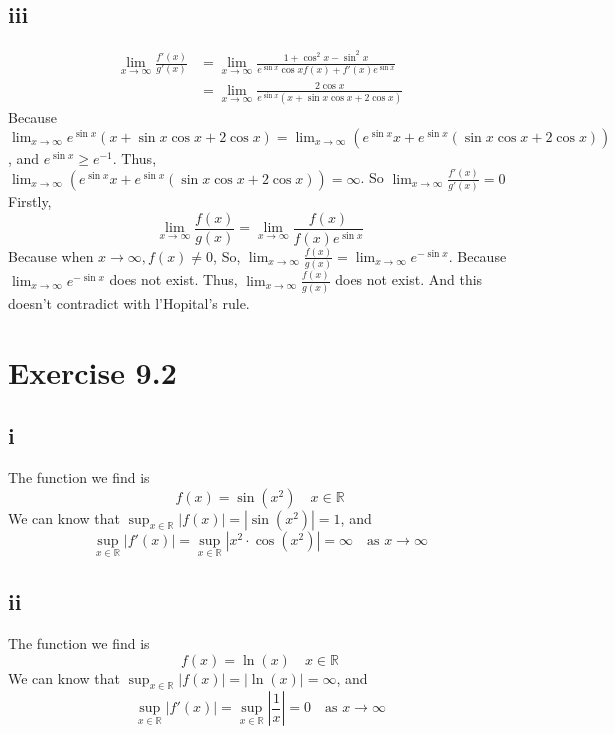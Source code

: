 \documentclass[11pt,twoside,a4paper]{article}
\begin{document}
\subsection{iii}
\begin{equation}
    \begin{aligned}
        \lim_{x \to \infty} \frac{f'(x)}{g'(x)}
        &= \lim_{x \to \infty} \frac{1+\cos ^2x-\sin ^2 x}{ e^{\sin x}\cos xf(x)+f'(x)e^{\sin x}} \\
        &=\lim_{x \to \infty}  \frac{2\cos x}{ e^{\sin x}(x+\sin x\cos x +2\cos x)}
    \end{aligned}
    \end{equation}
Because $\displaystyle \lim_{x \to \infty} e^{\sin x}(x+\sin x\cos x +2\cos x)
=\lim_{x \to \infty} (e^{\sin x}x+e^{\sin x} (\sin x\cos x +2\cos x))$,
 and $e^{\sin x} \ge e^{-1}$. Thus, 
 $\displaystyle \lim_{x \to \infty} (e^{\sin x}x+e^{\sin x} (\sin x\cos x +2\cos x))=\infty$.
 \newline
So $\displaystyle \lim_{x \to \infty} \frac{f'(x)}{g'(x)}=0$
\newline
Firstly, 
$$\lim_{x \to \infty} \frac{f(x)}{g(x)}
=\lim_{x \to \infty} \frac{f(x)}{f(x)e^{\sin x}}  $$
Because when $x\rightarrow \infty, f(x)\neq 0$,
So, 
$\displaystyle \lim_{x \to \infty} \frac{f(x)}{g(x)}
= \lim_{x \to \infty} e^{-\sin x} $.
 Because $\displaystyle \lim_{x \to \infty} e^{-\sin x}$ does not exist.
 Thus, $\displaystyle \lim_{x \to \infty} \frac{f(x)}{g(x)}$ does not exist.
And this doesn't contradict with l'Hopital's rule.

\section{Exercise 9.2}
\subsection{i}
The function we find is $$f(x)=\sin (x^2) \quad x\in \mathbb{R} $$
We can know that $\displaystyle\sup_{x\in \mathbb{R}} |f(x)|=|\sin (x^2)|=1$, 
and $$\sup_{x\in \mathbb{R}} |f'(x)|=\sup_{x\in \mathbb{R}} |x^2\cdot\cos (x^2)|
=\infty \quad \text{as } x \rightarrow \infty$$

\subsection{ii}
The function we find is 
$$f(x)=\ln (x) \quad x\in \mathbb{R} $$
We can know that $\displaystyle\sup_{x\in \mathbb{R}} |f(x)|=|\ln (x)|=\infty$, and
$$\sup_{x\in \mathbb{R}} |f'(x)|=\sup_{x\in \mathbb{R}} |\frac{1}{x}|
=0 \quad \text{as } x \rightarrow \infty$$
\end{document}

